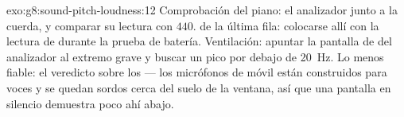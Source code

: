 \begin{solution}{exo:g8:sound-pitch-loudness:12}
Comprobación del piano: el analizador junto a la cuerda, y comparar su
lectura con $440$.  de la última fila: colocarse allí con la
lectura de  durante la prueba de batería. Ventilación:
apuntar la pantalla de  del analizador al extremo grave y
buscar un pico por debajo de \qty{20}{Hz}. Lo menos fiable: el
veredicto sobre los  --- los micrófonos de móvil están
construidos para voces y se quedan sordos cerca del suelo de la
ventana, así que una pantalla en silencio demuestra poco ahí abajo.
\end{solution}

